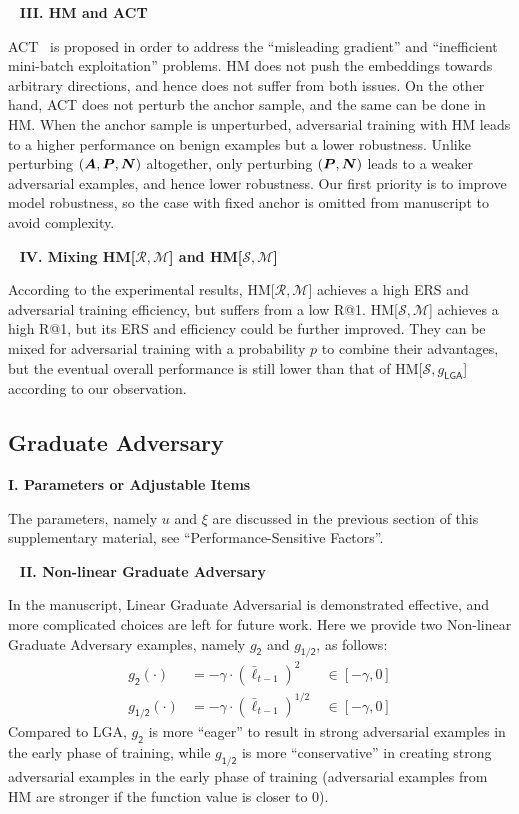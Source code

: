~\newline
\noindent\textbf{III. HM and ACT}

ACT~\cite{robrank} is proposed in order to address the ``misleading gradient''
and ``inefficient mini-batch exploitation'' problems.
%
HM does not push the embeddings towards arbitrary directions, and hence does
not suffer from both issues.
%
On the other hand, ACT does not perturb the anchor sample, and the same
can be done in HM.
%
When the anchor sample is unperturbed, adversarial training with HM leads to
a higher performance on benign examples but a lower robustness.
%
Unlike perturbing $({\bm{A}}, {\bm{P}}, {\bm{N}})$ altogether, only perturbing $({\bm{P}}, {\bm{N}})$
leads to a weaker adversarial examples, and hence lower robustness.
%
Our first priority is to improve model robustness, so the case with fixed
anchor is omitted from manuscript to avoid complexity.

~\newline
\noindent\textbf{IV. Mixing HM[$\mathcal{R},\mathcal{M}$] and
HM[$\mathcal{S},\mathcal{M}$]}

According to the experimental results, HM[$\mathcal{R},\mathcal{M}$] achieves 
a high ERS and adversarial training efficiency, but suffers from a low R@1.
%
HM[$\mathcal{S},\mathcal{M}$] achieves a high R@1, but its ERS and efficiency
could be further improved.
%
They can be mixed for adversarial training with a probability $p$ to combine
their advantages, but the eventual overall performance is still lower than
that of HM[$\mathcal{S},g_\mathsf{LGA}$] according to our observation.

\subsection{Graduate Adversary}
\label{sec:b3}

\noindent\textbf{I. Parameters or Adjustable Items}

The parameters, namely $u$ and $\xi$ are discussed in the previous section
of this supplementary material, see ``Performance-Sensitive Factors''.

~\newline
\noindent\textbf{II. Non-linear Graduate Adversary}

In the manuscript, Linear Graduate Adversarial is demonstrated effective,
and more complicated choices are left for future work.
%
Here we provide two Non-linear Graduate Adversary examples, namely
$g_\mathsf{2}$ and $g_\mathsf{1/2}$, as follows:
%
\begin{align}
	g_\mathsf{2}(\cdot)   &= -\gamma \cdot (\bar{\ell}_{t-1})^{2}  &~ \in [-\gamma,0]\\
	g_\mathsf{1/2}(\cdot) &= -\gamma \cdot (\bar{\ell}_{t-1})^{1/2} &~ \in [-\gamma, 0]
\end{align}
%
Compared to LGA, $g_\mathsf{2}$ is more ``eager'' to result in strong adversarial
examples in the early phase of training, while $g_\mathsf{1/2}$ is more ``conservative''
in creating strong adversarial examples in the early phase of training
(adversarial examples from HM are stronger if the function value is closer to $0$).

